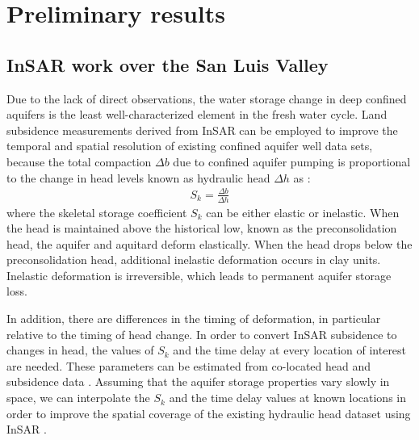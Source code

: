 \documentclass[11pt,final]{article}%
\renewcommand{\citep}{\cite}
\begin{document}
\section{Preliminary results}\label{sec:previous}
\subsection{InSAR work over the San Luis Valley}\label{sec:previous InSAR}
Due to the lack of direct observations, the water storage change in deep confined aquifers is the least well-characterized element in the fresh water cycle. Land subsidence measurements derived from InSAR can be employed to improve the temporal and spatial resolution of existing confined aquifer well data sets, because the total compaction $\Delta b$ due to confined aquifer pumping is proportional to the change in head levels known as hydraulic head $\Delta h$ as \citep[e.g.,][]{galloway2011}:
\begin{align}
  S_{k} = \frac{\Delta b}{\Delta h}
\label{eq:elastic}  
\end{align}
where the skeletal storage coefficient $S_{k}$ can be either elastic or inelastic. When the head is maintained above the historical low, known as the preconsolidation head, the aquifer and aquitard deform elastically. When the head drops below the preconsolidation head, additional inelastic deformation occurs in clay units. Inelastic deformation is irreversible, which leads to permanent aquifer storage loss. 

In addition, there are differences in the timing of deformation, in particular relative to the timing of head change. In order to convert InSAR subsidence to changes in head, the values of $S_{k}$  and the time delay at every location of interest are needed. These parameters can be estimated from co-located head and subsidence data \citep{Chen2016}. Assuming that the aquifer storage properties vary slowly in space, we can interpolate the $S_{k}$ and the time delay values at known locations in order to improve the spatial coverage of the existing hydraulic head dataset using InSAR \citep{Chen2017}.
\end{document}
